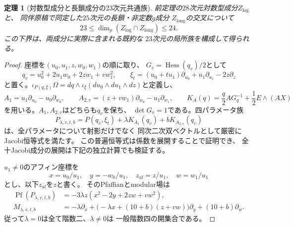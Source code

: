 \documentclass[a4paper,11pt]{ltjsarticle}
\newtheorem{theorem}{定理}[section]
\theoremstyle{remark}\newtheorem{remark}[theorem]{注意}
\begin{document}
\begin{theorem}[対数型成分と長鎖成分の23次元共通族]
\label{thm:log-long-intersection23}
前定理の$28$次元対数型成分$Z_{\mathrm{log}}$と、
同伴原稿で同定した$25$次元の長鎖・非定数$g$成分
$Z_{\mathrm{long}}$の交叉について
\begin{equation}\label{eq:log-long-dim23}
 \boxed{\quad
 23\le\dim_p(Z_{\mathrm{log}}\cap Z_{\mathrm{long}})\le24.
 \quad}
\end{equation}
この下界は、両成分に実際に含まれる既約な
$23$次元の局所族を構成して得られる。
\end{theorem}
\begin{proof}
座標を$(u_0,u_1,z,w_0,w_1)$の順に取り、
$G_v=\operatorname{Hess}(q_v)/2$として
\[
 q_v=u_0^2+2u_1w_0+2zw_1+vw_1^2,\qquad
 \xi_t=(u_0+tu_1)\partial_{u_0}
             +u_1\partial_{u_1}-2z\partial_z
\]
と置く。$\iota_{P(q,\xi)}\Omega
=dq\wedge\iota_\xi(du_0\wedge du_1\wedge dz)$と定義し、
\[
 A_1=u_1\partial_{u_0}-u_0\partial_{w_0},\qquad
 A_{2,v}=(z+vw_1)\partial_{w_0}-u_1\partial_{w_1},
 \qquad
 K_A(q)=\frac q2 A G_q^{-1}+\frac12E\wedge(AX)
\]
を用いる。$A_1,A_{2,v}$はどちらも$q_v$を保ち、
$\det G_v=1$である。四パラメータ族
\begin{equation}\label{eq:intersection-four-param}
 P_{\lambda,v,t,b}
  =P(q_v,\xi_t)+\lambda K_{A_1}(q_v)
                  +bK_{A_{2,v}}(q_v)
\end{equation}
は、全パラメータについて射影だけでなく
同次二次双ベクトルとして厳密にJacobi恒等式を満たす。
この普遍恒等式は係数を展開することで証明でき、
全十Jacobi成分の展開は下記の独立計算でも検証する。

$u_1\ne0$のアフィン座標を
\[
 x=u_0/u_1,\quad y=-w_0/u_1,\quad
 z_{\mathrm{af}}=z/u_1,\quad w=w_1/u_1
\]
とし、以下$z_{\mathrm{af}}$を$z$と書く。
そのPfaffianとmodular場は
\begin{align}
 \operatorname{Pf}(P_{\lambda,v,t,b})
   &=-3\lambda z(x^2-2y+2zw+vw^2),\label{eq:intersection-pf}\\
 M_{\lambda,v,t,b}
   &=-\lambda\partial_x
     +\bigl(-\lambda x+(10+b)(z+vw)\bigr)\partial_y
     +(10+b)\partial_w.\label{eq:intersection-mod}
\end{align}
従って$\lambda=0$は全て階数二、$\lambda\ne0$は
一般階数四の開集合である。


\end{proof}
\end{document}
